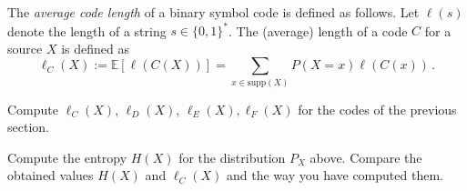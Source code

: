 \documentclass[10pt, a5paper]{scrartcl}
\newcommand{\len}{\ell}
\begin{document}

\begin{exercise}
  The \emph{average code length} of a binary symbol code is defined as follows.
  Let $\len(s)$ denote the length of a string $s \in \{0,1\}^*$. The (average)
  length of a code $C$ for a source $X$ is defined as
  \[
    \len_C(X) 
      := \mathbb{E}[\len(C(X))] 
      = \sum_{x \in \mathrm{supp}(X)} P(X=x) \len(C(x)) \, .
  \]

  \begin{subex}
    Compute $\len_C(X)$, $\len_D(X)$, $\len_E(X), \len_F(X)$ for the codes of
    the previous section.
  \end{subex}
  
  \begin{subex}
    Compute the entropy $H(X)$ for the distribution $P_X$ above. Compare the
    obtained values $H(X)$ and $\len_C(X)$ and the way you have computed them.
  \end{subex}
\end{exercise}

\end{document}
